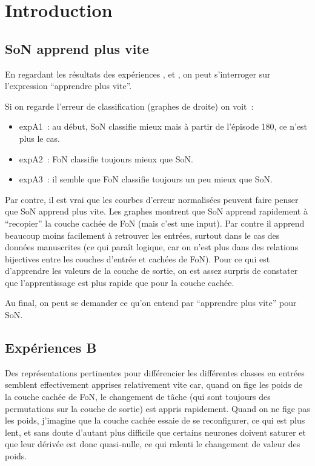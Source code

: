 \section{Introduction
\label{sec:intro}}
\subsection{SoN apprend plus vite
\label{sec:app_vite}}
En regardant les résultats des expériences ,  et , on peut s'interroger sur l'expression ``apprendre plus vite''.

Si on regarde l'erreur de classification (graphes de droite) on voit~:
\begin{itemize}
\item expA1~: au début, SoN classifie mieux mais à partir de l'épisode 180, ce n'est plus le cas.
\item expA2~: FoN classifie toujours mieux que SoN.
\item expA3~: il semble que FoN classifie toujours un peu mieux que SoN.
\end{itemize}

Par contre, il est vrai que les courbes d'erreur normalisées peuvent faire penser que SoN apprend plus vite. Les graphes montrent que SoN apprend rapidement à ``recopier'' la couche cachée de FoN (mais c'est une input). 
Par contre il apprend beaucoup moins facilement à retrouver les entrées, surtout dans le cas des données manuscrites (ce qui paraît logique, car on n'est plus dans des relations bijectives entre les couches d'entrée et cachées de FoN). 
Pour ce qui est d'apprendre les valeurs de la couche de sortie, on est assez surpris de constater que l'apprentissage est plus rapide que pour la couche cachée.

Au final, on peut se demander ce qu'on entend par ``apprendre plus vite'' pour SoN.
\subsection{Expériences B
\label{sec:expB}}

Des représentations pertinentes pour différencier les différentes classes en entrées semblent effectivement apprises relativement vite car, quand on fige les poids de la couche cachée de FoN, 
le changement de tâche (qui sont toujours des permutations sur la couche de sortie) est appris rapidement. 
Quand on ne fige pas les poids, j'imagine que la couche cachée essaie de se reconfigurer, ce qui est plus lent, et sans doute d'autant plus difficile 
que certains neurones doivent saturer et que leur dérivée est donc quasi-nulle, ce qui ralenti le changement de valeur des poids.

